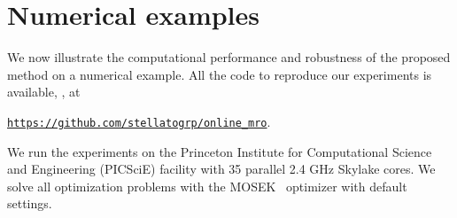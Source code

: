 







\section{Numerical examples}
\label{sec:exampless}
We now illustrate the computational performance and robustness of the proposed method on a numerical example.
All the code to reproduce our experiments is available, , at
\begin{center}
{\tt \url{https://github.com/stellatogrp/online_mro}}.
\end{center}
We run the experiments on the Princeton Institute for Computational Science and Engineering (PICSciE) facility with 35 parallel 2.4 GHz Skylake cores.
We solve all optimization problems with the MOSEK~\cite{mosek} optimizer with default settings.


